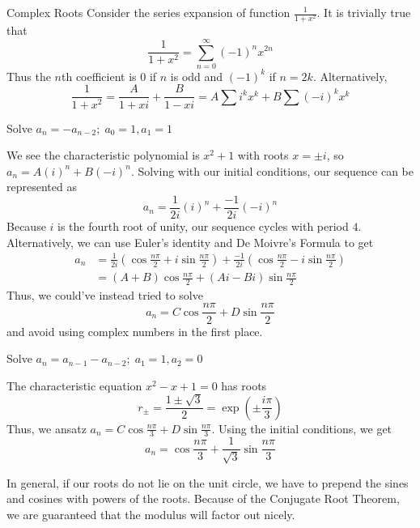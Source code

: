 \begin{subsection}{Complex Roots}
Consider the series expansion of function $\frac{1}{1+x^2}$. It is trivially true that 
$$\frac{1}{1+x^2} = \sum_{n=0}^\infty (-1)^n x^{2n}$$
Thus the $n$th coefficient is 0 if $n$ is odd and $(-1)^k$ if $n=2k$. Alternatively,
$$\frac{1}{1+x^2} = \frac{A}{1+xi} + \frac{B}{1-xi} = A\sum i^kx^k + B \sum (-i)^k x^k$$
\begin{problem}{1}
Solve $a_n = -a_{n-2}; \; a_0 = 1, a_1 = 1$
\end{problem}
\begin{solution}
We see the characteristic polynomial is $x^2 +1$ with roots $x=\pm i$, so $a_n = A(i)^n + B(-i)^n$. Solving with our initial conditions, our sequence can be represented as
$$a_n = \frac{1}{2i}(i)^n + \frac{-1}{2i}(-i)^n$$
Because $i$ is the fourth root of unity, our sequence cycles with period $4$. 
Alternatively, we can use Euler's identity and De Moivre's Formula to get
\begin{align*}
    a_n &= \frac{1}{2i}\left(\cos \frac{n\pi}{2} + i \sin\frac{n\pi}{2}\right) + \frac{-1}{2i}\left(\cos \frac{n\pi}{2} - i \sin\frac{n\pi}{2}\right) \\
    &= (A+B) \cos \frac{n\pi}{2} + (Ai-Bi)\sin \frac{n\pi}{2}
\end{align*}
Thus, we could've instead tried to solve 
$$a_n = C \cos \frac{n\pi}{2} + D \sin \frac{n\pi}{2}$$
and avoid using complex numbers in the first place.
\end{solution}
\begin{problem}{2}
Solve $a_n = a_{n-1} - a_{n-2}; \; a_1 = 1, a_2 = 0$
\end{problem}
\begin{solution}
    The characteristic equation $x^2 - x + 1 = 0$ has roots $$r_\pm = \frac{1 \pm \sqrt{3}}{2} = \exp\left(\pm\frac{i\pi}{3}\right)$$
    Thus, we ansatz $a_n = C \cos \frac{n\pi}{3} + D \sin \frac{n\pi}{3}$. Using the initial conditions, we get
    $$a_n = \cos \frac{n\pi}{3} + \frac{1}{\sqrt{3}} \sin \frac{n\pi}{3}$$
\end{solution}

In general, if our roots do not lie on the unit circle, we have to prepend the sines and cosines with powers of the roots. Because of the Conjugate Root Theorem, we are guaranteed that the modulus will factor out nicely.
\end{subsection}

